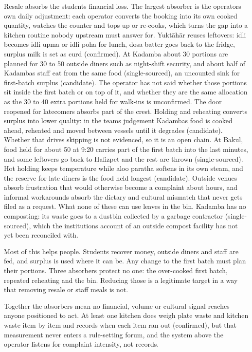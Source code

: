 \documentclass[
  10pt,
  table]{article}
\begin{document}
Resale absorbs the student\textquotesingle s financial loss. The largest absorber is the operator\textquotesingle s own daily adjustment: each operator converts the booking into its own cooked quantity, watches the counter and tops up or re-cooks, which turns the gap into a kitchen routine nobody upstream must answer for. Yuktāhār reuses leftovers: idli becomes idli upma or idli poha for lunch, dosa batter goes back to the fridge, surplus milk is set as curd (confirmed). At Kadamba about 30 portions are planned for 30 to 50 outside diners such as night-shift security, and about half of Kadamba\textquotesingle s staff eat from the same food (single-sourced), an uncounted sink for first-batch surplus (candidate). The operator has not said whether those portions sit inside the first batch or on top of it, and whether they are the same allocation as the 30 to 40 extra portions held for walk-ins is unconfirmed. The door reopened for latecomers absorbs part of the crest. Holding and reheating converts surplus into lower quality: in the team\textquotesingle s judgement Kadamba\textquotesingle s food is cooked ahead, reheated and moved between vessels until it degrades (candidate). Whether that drives skipping is not evidenced, so it is an open chain. At Bakul, food held for about 50 at 9:20 carries part of the first batch into the last minutes, and some leftovers go back to Hafizpet and the rest are thrown (single-sourced). Hot holding keeps temperature while aloo paratha softens in its own steam, and the reserve for late diners is the food held longest (candidate). Outside venues absorb frustration that would otherwise become a complaint about hours, and informal workarounds absorb the dietary and cultural mismatch that never gets filed as a request. What none of these can use leaves in the bin. Kadamba has no composting: its waste goes to a dustbin collected by a garbage contractor (single-sourced), which the institution\textquotesingle s account of an outside compost facility has not yet been reconciled with.

Most of this helps people. Students recover money, outside diners and staff are fed, and surplus is used where it can be. Any change to the first batch must plan their portions. Three absorbers protect no one: the over-cooked first batch, repeated reheating and the bin. Reducing those is a legitimate target in a way that removing resale or staff meals is not.

Together the absorbers mean no financial, volume or cultural signal reaches anyone positioned to act. At least one kitchen does weigh plate waste and kitchen waste item by item and records when each item ran out (confirmed), but that measurement never enters a rule-setting forum, and the system above the operator listens for complaint intensity, not records.
\end{document}

